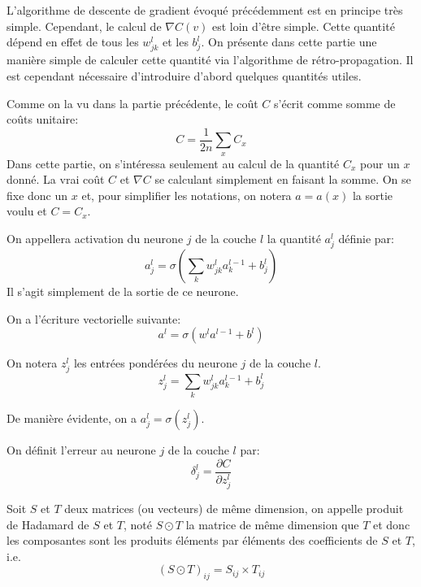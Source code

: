 L'algorithme de descente de gradient évoqué précédemment est en principe 
très simple. Cependant, le calcul de $\nabla C(v)$ est loin d'être simple. 
Cette quantité dépend en effet de tous les $w_{jk}^{l}$ et les $b_{j}^{l}$.
On présente dans cette partie une manière simple de calculer cette quantité 
via l'algorithme de rétro-propagation. 
Il est cependant nécessaire d'introduire d'abord quelques quantités utiles.

Comme on la vu dans la partie précédente, le coût $C$ s'écrit comme somme 
de coûts unitaire:
\[
C = \frac{1}{2n} \sum_{x} C_x
\]
Dans cette partie, on s'intéressa seulement au calcul de la quantité $C_x$ pour un $x$ donné. 
La vrai coût $C$ et $\nabla C$ se calculant simplement en faisant la somme.
On se fixe donc un $x$ et, pour simplifier les notations, on notera $a = a(x)$ 
la sortie voulu et $C = C_x$.

\begin{definition}
On appellera activation du neurone $j$ de la couche $l$ la quantité $a_{j}^{l}$ 
définie par:
\[
a_{j}^{l} = \sigma \left( \sum_{k} w_{jk}^{l} a_{k}^{l-1} + b_{j}^{l} \right)
\]
Il s'agit simplement de la sortie de ce neurone.
\end{definition}


\begin{proposition}
On a l'écriture vectorielle suivante:
\[
a^{l} = \sigma ( w^{l} a^{l-1} + b^{l} )
\]
\end{proposition}


\begin{definition}
On notera $z_{j}^{l}$ les entrées pondérées du neurone $j$ de la couche $l$.
\[
z_{j}^{l} = \sum_{k} w_{jk}^{l} a_{k}^{l-1} + b_{j}^{l}
\]
\end{definition}

De manière évidente, on a $a_{j}^{l} = \sigma(z_{j}^{l})$.


\begin{definition}
On définit l'erreur au neurone $j$ de la couche $l$ par:
\[
\delta_{j}^{l} = \frac{\partial C}{\partial z_{j}^{l}}
\]
\end{definition}


\begin{definition}
Soit $S$ et $T$ deux matrices (ou vecteurs) de même dimension, on appelle 
produit de Hadamard de $S$ et $T$, noté $S \odot T$ la matrice de même dimension 
que $T$ et donc les composantes sont les produits éléments par éléments des 
coefficients de $S$ et $T$, i.e.\/
\[
(S \odot T)_{ij} = S_{ij} \times T_{ij}
\]
\end{definition}



